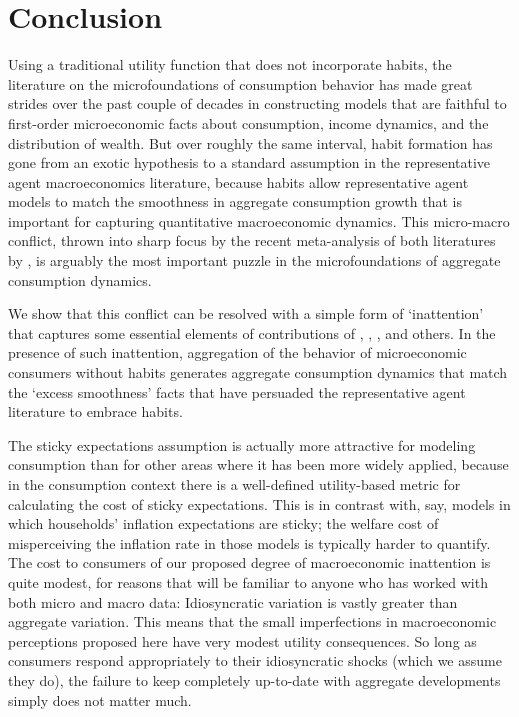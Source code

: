 \documentclass[titlepage]{./econtex}
\begin{document}
 

\section{Conclusion} \label{sec:Conclusion}

Using a traditional utility function that does not incorporate habits, the literature on the microfoundations of consumption behavior has made great strides over the past couple of decades in constructing models that are faithful to first-order microeconomic facts about consumption, income dynamics, and the distribution of wealth.  But over roughly the same interval, habit formation has gone from an exotic hypothesis to a standard assumption in the representative agent macroeconomics literature, because habits allow representative agent models to match the smoothness in aggregate consumption growth that is important for capturing quantitative macroeconomic dynamics.  This micro-macro conflict, thrown into sharp focus by the recent meta-analysis of both literatures by \cite{hrsHabit}, is arguably the most important puzzle in the microfoundations of aggregate consumption dynamics.

We show that this conflict can be resolved with a simple form of `inattention' that captures some essential elements of contributions of \cite{simsInattention}, \cite{woodfordImperfect}, \cite{mrSlumps}, and others.  In the presence of such inattention, aggregation of the behavior of microeconomic consumers without habits generates aggregate consumption dynamics that match the `excess smoothness' facts that have persuaded the representative agent literature to embrace habits.

The sticky expectations assumption is actually more attractive for modeling consumption than for other areas where it has been more widely applied, because in the consumption context there is a well-defined utility-based metric for calculating the cost of sticky expectations.  This is in contrast with, say, models in which households' inflation expectations are sticky; the welfare cost of misperceiving the inflation rate in those models is typically harder to quantify.  The cost to consumers of our proposed degree of macroeconomic inattention is quite modest, for reasons that will be familiar to anyone who has worked with both micro and macro data: Idiosyncratic variation is vastly greater than aggregate variation.  This means that the small imperfections in macroeconomic perceptions proposed here have very modest utility consequences.  So long as consumers respond appropriately to their idiosyncratic shocks (which we assume they do), the failure to keep completely up-to-date with aggregate developments simply does not matter much.
\end{document}
